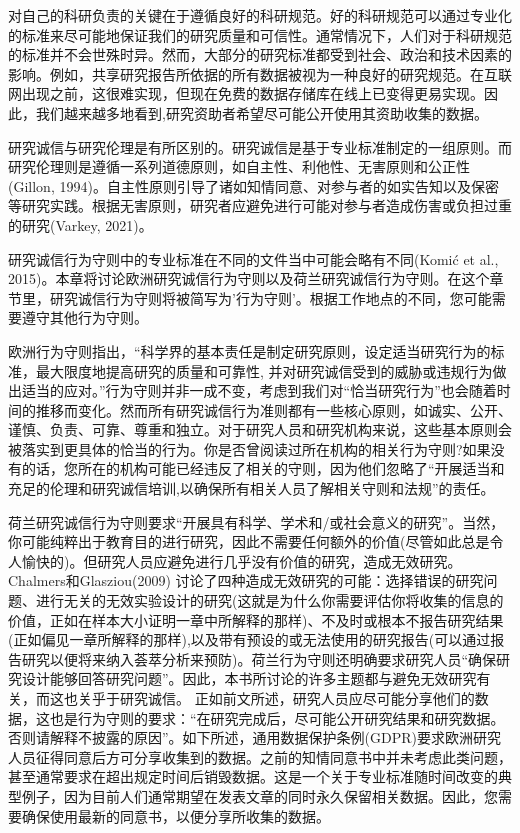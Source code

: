 \documentclass[
  letterpaper,
  DIV=11,
  numbers=noendperiod]{scrreprt}
\begin{document}
对自己的科研负责的关键在于遵循良好的科研规范。好的科研规范可以通过专业化的标准来尽可能地保证我们的研究质量和可信性。通常情况下，人们对于科研规范的标准并不会世殊时异。然而，大部分的研究标准都受到社会、政治和技术因素的影响。例如，共享研究报告所依据的所有数据被视为一种良好的研究规范。在互联网出现之前，这很难实现，但现在免费的数据存储库在线上已变得更易实现。因此，我们越来越多地看到,研究资助者希望尽可能公开使用其资助收集的数据。

研究诚信与研究伦理是有所区别的。研究诚信是基于专业标准制定的一组原则。而研究伦理则是遵循一系列道德原则，如自主性、利他性、无害原则和公正性(Gillon,
1994)。自主性原则引导了诸如知情同意、对参与者的如实告知以及保密等研究实践。根据无害原则，研究者应避免进行可能对参与者造成伤害或负担过重的研究(Varkey,
2021)。

研究诚信行为守则中的专业标准在不同的文件当中可能会略有不同(Komić et al.,
2015)。本章将讨论欧洲研究诚信行为守则以及荷兰研究诚信行为守则。在这个章节里，研究诚信行为守则将被简写为'行为守则'。根据工作地点的不同，您可能需要遵守其他行为守则。

欧洲行为守则指出，``科学界的基本责任是制定研究原则，设定适当研究行为的标准，最大限度地提高研究的质量和可靠性,
并对研究诚信受到的威胁或违规行为做出适当的应对。''行为守则并非一成不变，考虑到我们对``恰当研究行为''也会随着时间的推移而变化。然而所有研究诚信行为准则都有一些核心原则，如诚实、公开、谨慎、负责、可靠、尊重和独立。对于研究人员和研究机构来说，这些基本原则会被落实到更具体的恰当的行为。你是否曾阅读过所在机构的相关行为守则?如果没有的话，您所在的机构可能已经违反了相关的守则，因为他们忽略了``开展适当和充足的伦理和研究诚信培训,以确保所有相关人员了解相关守则和法规''的责任。

荷兰研究诚信行为守则要求``开展具有科学、学术和/或社会意义的研究''。当然，你可能纯粹出于教育目的进行研究，因此不需要任何额外的价值(尽管如此总是令人愉快的)。但研究人员应避免进行几乎没有价值的研究，造成无效研究。Chalmers和Glasziou(2009)
讨论了四种造成无效研究的可能：选择错误的研究问题、进行无关的无效实验设计的研究(这就是为什么你需要评估你将收集的信息的价值，正如在样本大小证明一章中所解释的那样)、不及时或根本不报告研究结果(正如偏见一章所解释的那样),以及带有预设的或无法使用的研究报告(可以通过报告研究以便将来纳入荟萃分析来预防)。荷兰行为守则还明确要求研究人员``确保研究设计能够回答研究问题''。因此，本书所讨论的许多主题都与避免无效研究有关，而这也关乎于研究诚信。
正如前文所述，研究人员应尽可能分享他们的数据，这也是行为守则的要求：``在研究完成后，尽可能公开研究结果和研究数据。否则请解释不披露的原因''。如下所述，通用数据保护条例(GDPR)要求欧洲研究人员征得同意后方可分享收集到的数据。之前的知情同意书中并未考虑此类问题，甚至通常要求在超出规定时间后销毁数据。这是一个关于专业标准随时间改变的典型例子，因为目前人们通常期望在发表文章的同时永久保留相关数据。因此，您需要确保使用最新的同意书，以便分享所收集的数据。
\end{document}
